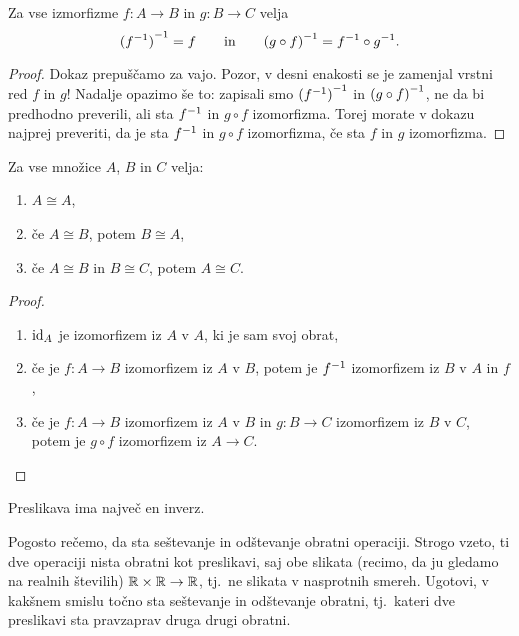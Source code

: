 \begin{trditev}
  Za vse izmorfizme $f : A \to B$ in $g : B \to C$ velja
  \begin{equation*}
    \inv{(\inv{f})} = f
    \qquad\text{in}\qquad
    \inv{(g \circ f)} = \inv{f} \circ \inv{g}.
  \end{equation*}
\end{trditev}

\begin{proof}
  Dokaz prepuščamo za vajo. Pozor, v desni enakosti se je zamenjal vrstni red $f$ in $g$!
  Nadalje opazimo še to: zapisali smo $\inv{(\inv{f})}$ in $\inv{(g \circ f)}$, ne da bi
  predhodno preverili, ali sta $\inv{f}$ in $g \circ f$ izomorfizma. Torej morate v dokazu
  najprej preveriti, da je sta $\inv{f}$ in $g \circ f$ izomorfizma, če sta $f$ in $g$
  izomorfizma.
\end{proof}

\begin{trditev}
  Za vse množice $A$, $B$ in $C$ velja:
  \begin{enumerate}
  \item $A \cong A$,
  \item če $A \cong B$, potem $B \cong A$,
  \item če $A \cong B$ in $B \cong C$, potem $A \cong C$.
  \end{enumerate}
\end{trditev}

\begin{proof}
  \parbox{0pt}{}
  \begin{enumerate}
  \item $\id[A]$ je izomorfizem iz $A$ v $A$, ki je sam svoj obrat,
  \item če je $f : A \to B$ izomorfizem iz $A$ v $B$, potem je $\inv{f}$ izomorfizem iz
    $B$ v $A$ in $f$,
  \item če je $f : A \to B$ izomorfizem iz $A$ v $B$ in $g : B \to C$ izomorfizem iz $B$ v
    $C$, potem je $g \circ f$ izomorfizem iz $A \to C$. \qedhere
  \end{enumerate}
\end{proof}

\begin{trditev}
  Preslikava ima največ en inverz.
\end{trditev}

\begin{vaja}
  Pogosto rečemo, da sta seštevanje in odštevanje obratni operaciji. Strogo vzeto, ti dve
  operaciji nista obratni kot preslikavi, saj obe slikata (recimo, da ju gledamo na
  realnih številih) $\RR \times \RR \to \RR$, tj.~ne slikata v nasprotnih smereh. Ugotovi,
  v kakšnem smislu točno sta seštevanje in odštevanje obratni, tj.~kateri dve preslikavi
  sta pravzaprav druga drugi obratni.
\end{vaja}

